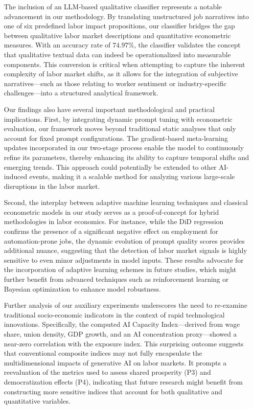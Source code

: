 \documentclass{article} %
\begin{document}
The inclusion of an LLM-based qualitative classifier represents a notable advancement in our methodology. By translating unstructured job narratives into one of six predefined labor impact propositions, our classifier bridges the gap between qualitative labor market descriptions and quantitative econometric measures. With an accuracy rate of \(74.97\%\), the classifier validates the concept that qualitative textual data can indeed be operationalized into measurable components. This conversion is critical when attempting to capture the inherent complexity of labor market shifts, as it allows for the integration of subjective narratives—such as those relating to worker sentiment or industry-specific challenges—into a structured analytical framework.

Our findings also have several important methodological and practical implications. First, by integrating dynamic prompt tuning with econometric evaluation, our framework moves beyond traditional static analyses that only account for fixed prompt configurations. The gradient-based meta-learning updates incorporated in our two-stage process enable the model to continuously refine its parameters, thereby enhancing its ability to capture temporal shifts and emerging trends. This approach could potentially be extended to other AI-induced events, making it a scalable method for analyzing various large-scale disruptions in the labor market.

Second, the interplay between adaptive machine learning techniques and classical econometric models in our study serves as a proof-of-concept for hybrid methodologies in labor economics. For instance, while the DiD regression confirms the presence of a significant negative effect on employment for automation-prone jobs, the dynamic evolution of prompt quality scores provides additional nuance, suggesting that the detection of labor market signals is highly sensitive to even minor adjustments in model inputs. These results advocate for the incorporation of adaptive learning schemes in future studies, which might further benefit from advanced techniques such as reinforcement learning or Bayesian optimization to enhance model robustness.

Further analysis of our auxiliary experiments underscores the need to re-examine traditional socio-economic indicators in the context of rapid technological innovations. Specifically, the computed AI Capacity Index—derived from wage share, union density, GDP growth, and an AI concentration proxy—showed a near-zero correlation with the exposure index. This surprising outcome suggests that conventional composite indices may not fully encapsulate the multidimensional impacts of generative AI on labor markets. It prompts a reevaluation of the metrics used to assess shared prosperity (P3) and democratization effects (P4), indicating that future research might benefit from constructing more sensitive indices that account for both qualitative and quantitative variables.
\end{document}

